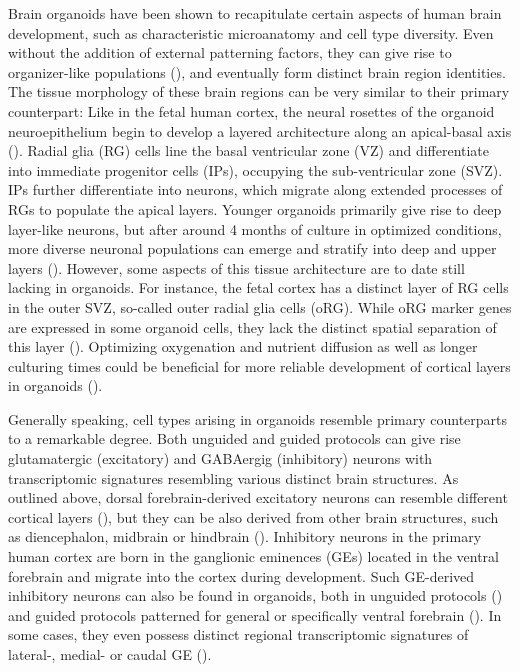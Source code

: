 Brain organoids have been shown to recapitulate certain aspects of human brain development, such as characteristic microanatomy and cell type diversity. Even without the addition of external patterning factors, they can give rise to organizer-like populations (\cite{renner_self-organized_2017}), and eventually form distinct brain region identities. The tissue morphology of these brain regions can be very similar to their primary counterpart: Like in the fetal human cortex, the neural rosettes of the organoid neuroepithelium begin to develop a layered architecture along an apical-basal axis (\cite{kadoshima_self-organization_2013,lancaster_cerebral_2013}). Radial glia (RG) cells line the basal ventricular zone (VZ) and differentiate into immediate progenitor cells (IPs), occupying the sub-ventricular zone (SVZ). IPs further differentiate into neurons, which migrate along extended processes of RGs to populate the apical layers. Younger organoids primarily give rise to deep layer-like neurons, but after around 4 months of culture in optimized conditions, more diverse neuronal populations can emerge and stratify into deep and upper layers (\cite{kanton_organoid_2019,qian_sliced_2020}). However, some aspects of this tissue architecture are to date still lacking in organoids. For instance, the fetal cortex has a distinct layer of RG cells in the outer SVZ, so-called outer radial glia cells (oRG). While oRG marker genes are expressed in some organoid cells, they lack the distinct spatial separation of this layer (\cite{bhaduri_cell_2020}). Optimizing oxygenation and nutrient diffusion as well as longer culturing times could be beneficial for more reliable development of cortical layers in organoids (\cite{bhaduri_cell_2020,chiaradia_brain_2020}).

Generally speaking, cell types arising in organoids resemble primary counterparts to a remarkable degree. Both unguided and guided protocols can give rise glutamatergic (excitatory) and GABAergig (inhibitory) neurons with transcriptomic signatures resembling various distinct brain structures. As outlined above, dorsal forebrain-derived excitatory neurons can resemble different cortical layers (\cite{kanton_organoid_2019,qian_sliced_2020}), but they can be also derived from other brain structures, such as diencephalon, midbrain or hindbrain (\cite{kanton_organoid_2019}). 
Inhibitory neurons in the primary human cortex are born in the ganglionic eminences (GEs) located in the ventral forebrain and migrate into the cortex during development. Such GE-derived inhibitory neurons can also be found in organoids, both in unguided protocols (\cite{kanton_organoid_2019}) and guided protocols patterned for general or specifically ventral forebrain (\cite{velasco_individual_2019,birey_assembly_2017,miura_generation_2020}). In some cases, they even possess distinct regional transcriptomic signatures of lateral-, medial- or caudal GE (\cite{kanton_organoid_2019,miura_generation_2020}). 

